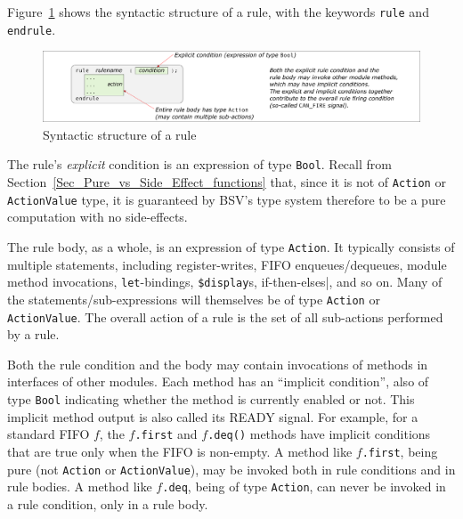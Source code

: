 

Figure~\ref{Fig_Rule_Structure} shows the syntactic structure of a
rule, with the keywords \verb|rule| and \verb|endrule|.
\begin{figure}[htbp]
  \centerline{\includegraphics[width=6in,angle=0]{Figures/Fig_Rule_Structure}}
  \caption{\label{Fig_Rule_Structure} Syntactic structure of a rule}
\end{figure}


The rule's \emph{explicit} condition is an expression of type
\verb|Bool|.  Recall from
Section~\ref{Sec_Pure_vs_Side_Effect_functions} that, since it is not
of \verb|Action| or \verb|ActionValue| type, it is guaranteed by BSV's
type system therefore to be a pure computation with no side-effects.


The rule body, as a whole, is an expression of type \verb|Action|.  It
typically consists of multiple statements, including register-writes,
FIFO enqueues/dequeues, module method invocations,
\verb|let|-bindings, \verb|$display|s, if-then-elses|, and so on.
Many of the statements/sub-expressions will themselves be of type
\verb|Action| or \verb|ActionValue|.  The overall action of a rule is
the set of all sub-actions performed by a rule.


Both the rule condition and the body may contain invocations of
methods in interfaces of other modules.  Each method has an ``implicit
condition'', also of type \verb|Bool| indicating whether the method is
currently enabled or not.  This implicit method output is also called
its READY signal.  For example, for a standard FIFO $f$, the
$f$\verb|.first| and $f$\verb|.deq()| methods have implicit conditions
that are true only when the FIFO is non-empty.  A method like
$f$\verb|.first|, being pure (not \verb|Action| or
\verb|ActionValue|), may be invoked both in rule conditions and in
rule bodies.  A method like $f$\verb|.deq|, being of type
\verb|Action|, can never be invoked in a rule condition, only in a
rule body.

